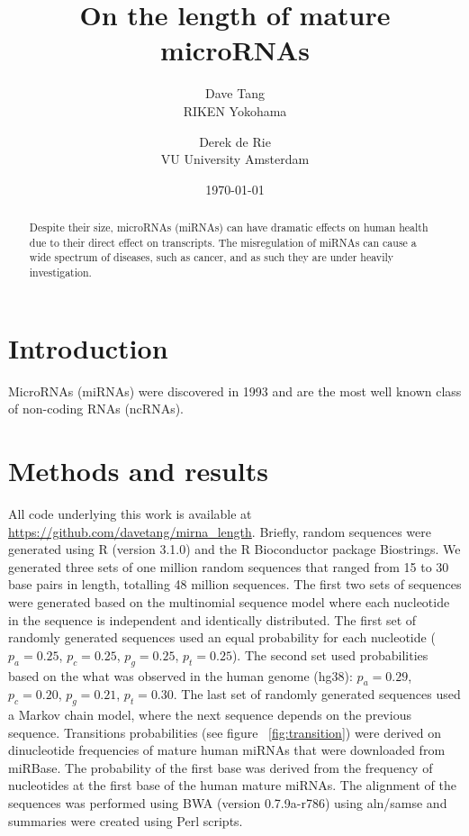 \documentclass{article}
\title{On the length of mature microRNAs}
\author{Dave Tang  \\
	RIKEN Yokohama \\
	\and 
	Derek de Rie \\
	VU University Amsterdam \\
	}
\date{\today}
\begin{document}
\maketitle

\begin{abstract}
Despite their size, microRNAs (miRNAs) can have dramatic effects on human health due to their direct effect on transcripts. The misregulation of miRNAs can cause a wide spectrum of diseases, such as cancer, and as such they are under heavily investigation.

\end{abstract}

\section{Introduction}

MicroRNAs (miRNAs) were discovered in 1993\cite{pmid8252621} and are the most well known class of non-coding RNAs (ncRNAs).

\section{Methods and results}\label{method_and_result}

All code underlying this work is available at \url{https://github.com/davetang/mirna_length}. Briefly, random sequences were generated using R (version 3.1.0) and the R Bioconductor package Biostrings\cite{biostrings_package}. We generated three sets of one million random sequences that ranged from 15 to 30 base pairs in length, totalling 48 million sequences. The first two sets of sequences were generated based on the multinomial sequence model where each nucleotide in the sequence is independent and identically distributed. The first set of randomly generated sequences used an equal probability for each nucleotide ($p_{a} = 0.25$, $p_{c} = 0.25$, $p_{g} = 0.25$, $p_{t} = 0.25$). The second set used probabilities based on the what was observed in the human genome (hg38): $p_{a} = 0.29$, $p_{c} = 0.20$, $p_{g} = 0.21$, $p_{t} = 0.30$. The last set of randomly generated sequences used a Markov chain model, where the next sequence depends on the previous sequence. Transitions probabilities (see figure ~\ref{fig:transition}) were derived on dinucleotide frequencies of mature human miRNAs that were downloaded from miRBase\cite{pmid21037258}. The probability of the first base was derived from the frequency of nucleotides at the first base of the human mature miRNAs. The alignment of the sequences was performed using BWA\cite{pmid19451168} (version 0.7.9a-r786) using aln/samse and summaries were created using Perl scripts.
\end{document}
